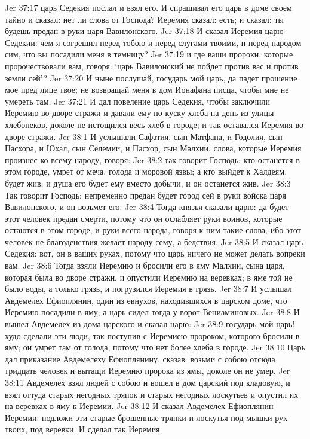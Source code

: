 Jer 37:17  царь Седекия послал и взял его. И спрашивал его царь в доме своем тайно и сказал: нет ли слова от Господа? Иеремия сказал: есть; и сказал: ты будешь предан в руки царя Вавилонского.
Jer 37:18  И сказал Иеремия царю Седекии: чем я согрешил перед тобою и перед слугами твоими, и перед народом сим, что вы посадили меня в темницу?
Jer 37:19  и где ваши пророки, которые пророчествовали вам, говоря: `царь Вавилонский не пойдет против вас и против земли сей'?
Jer 37:20  И ныне послушай, государь мой царь, да падет прошение мое пред лице твое; не возвращай меня в дом Ионафана писца, чтобы мне не умереть там.
Jer 37:21  И дал повеление царь Седекия, чтобы заключили Иеремию во дворе стражи и давали ему по куску хлеба на день из улицы хлебопеков, доколе не истощился весь хлеб в городе; и так оставался Иеремия во дворе стражи.
Jer 38:1  И услышали Сафатия, сын Матфана, и Годолия, сын Пасхора, и Юхал, сын Селемии, и Пасхор, сын Малхии, слова, которые Иеремия произнес ко всему народу, говоря:
Jer 38:2  так говорит Господь: кто останется в этом городе, умрет от меча, голода и моровой язвы; а кто выйдет к Халдеям, будет жив, и душа его будет ему вместо добычи, и он останется жив.
Jer 38:3  Так говорит Господь: непременно предан будет город сей в руки войска царя Вавилонского, и он возьмет его.
Jer 38:4  Тогда князья сказали царю: да будет этот человек предан смерти, потому что он ослабляет руки воинов, которые остаются в этом городе, и руки всего народа, говоря к ним такие слова; ибо этот человек не благоденствия желает народу сему, а бедствия.
Jer 38:5  И сказал царь Седекия: вот, он в ваших руках, потому что царь ничего не может делать вопреки вам.
Jer 38:6  Тогда взяли Иеремию и бросили его в яму Малхии, сына царя, которая была во дворе стражи, и опустили Иеремию на веревках; в яме той не было воды, а только грязь, и погрузился Иеремия в грязь.
Jer 38:7  И услышал Авдемелех Ефиоплянин, один из евнухов, находившихся в царском доме, что Иеремию посадили в яму; а царь сидел тогда у ворот Вениаминовых.
Jer 38:8  И вышел Авдемелех из дома царского и сказал царю:
Jer 38:9  государь мой царь! худо сделали эти люди, так поступив с Иеремиею пророком, которого бросили в яму; он умрет там от голода, потому что нет более хлеба в городе.
Jer 38:10  Царь дал приказание Авдемелеху Ефиоплянину, сказав: возьми с собою отсюда тридцать человек и вытащи Иеремию пророка из ямы, доколе он не умер.
Jer 38:11  Авдемелех взял людей с собою и вошел в дом царский под кладовую, и взял оттуда старых негодных тряпок и старых негодных лоскутьев и опустил их на веревках в яму к Иеремии.
Jer 38:12  И сказал Авдемелех Ефиоплянин Иеремии: подложи эти старые брошенные тряпки и лоскутья под мышки рук твоих, под веревки. И сделал так Иеремия.
